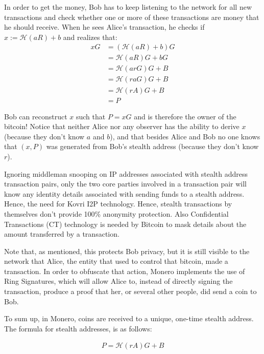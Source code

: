 In order to get the money, Bob has to keep listening to the network for all new transactions and check whether one or more of these transactions are money that he should receive. When he sees Alice's transaction, he checks if $x := \mathcal{H}(aR)+b$ and realizes that:
\begin{align*}\label{eq:checkstealth}
  xG &= (\mathcal{H}(aR)+b)G \\
     &= \mathcal{H}(aR)G+bG \\
     &= \mathcal{H}(arG)G+B \\
     &= \mathcal{H}(raG)G+B \\
     &= \mathcal{H}(rA)G+B \\
     &= P
\end{align*}

Bob can reconstruct $x$ such that $P = xG$ and is therefore the owner of the bitcoin! Notice that neither Alice nor any observer has the ability to derive $x$ (because they don't know $a$ and $b$), and that besides Alice and Bob no one knows that $(x,P)$ was generated from Bob's stealth address (because they don't know $r$).

Ignoring middleman snooping on IP addresses associated with stealth address transaction pairs, only the two core parties involved in a transaction pair will know any identity details associated with sending funds to a stealth address. Hence, the need for Kovri I2P technology. Hence, stealth transactions by themselves don't provide 100\% anonymity protection. Also Confidential Transactions (CT) technology is needed by Bitcoin to mask details about the amount transferred by a transaction.

Note that, as mentioned, this protects Bob privacy, but it is still visible to the network that Alice, the entity that used to control that bitcoin, made a transaction. In order to obfuscate that action, Monero implements the use of Ring Signatures, which will allow Alice to, instead of directly signing the transaction, produce a proof that her, or several other people, did send a coin to Bob.

To sum up, in Monero, coins are received to a unique, one-time stealth address. The formula for stealth addresses, is as follows:

\begin{align*}
  P = \mathcal{H}(rA)G + B
\end{align*}

